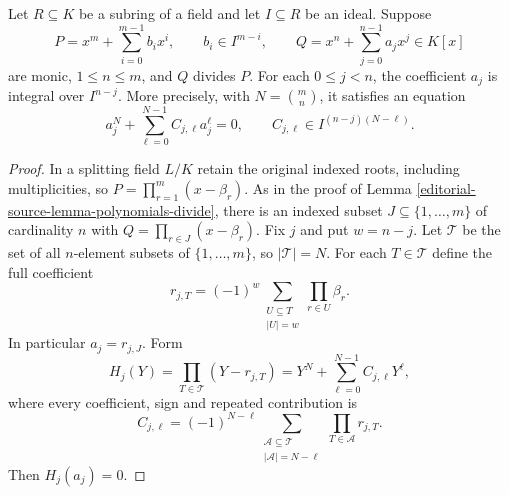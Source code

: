 \begin{lemma}
\label{editorial-source-lemma-weighted-monic-factor-coefficients}
Let $R\subseteq K$ be a subring of a field and let $I\subseteq R$
be an ideal. Suppose
$$
P=x^m+\sum_{i=0}^{m-1}b_ix^i,\qquad b_i\in I^{m-i},
\qquad Q=x^n+\sum_{j=0}^{n-1}a_jx^j\in K[x]
$$
are monic, $1\leq n\leq m$, and $Q$ divides $P$.
For each $0\leq j<n$, the coefficient $a_j$ is integral over
$I^{n-j}$. More precisely, with $N=\binom{m}{n}$, it satisfies
an equation
$$
a_j^N+\sum_{\ell=0}^{N-1}C_{j,\ell}a_j^\ell=0,
\qquad C_{j,\ell}\in I^{(n-j)(N-\ell)}.
$$
\end{lemma}

\begin{proof}
In a splitting field $L/K$ retain the original indexed roots,
including multiplicities, so
$P=\prod_{r=1}^m(x-\beta_r)$. As in the proof of
Lemma \ref{editorial-source-lemma-polynomials-divide}, there is an indexed subset
$J\subseteq\{1,\ldots,m\}$ of cardinality $n$ with
$Q=\prod_{r\in J}(x-\beta_r)$. Fix $j$ and put $w=n-j$.
Let $\mathcal T$ be the set of all $n$-element subsets of
$\{1,\ldots,m\}$, so $|\mathcal T|=N$. For each $T\in\mathcal T$
define the full coefficient
$$
r_{j,T}=(-1)^w
\sum_{\substack{U\subseteq T\\|U|=w}}\prod_{r\in U}\beta_r.
$$
In particular $a_j=r_{j,J}$. Form
$$
H_j(Y)=\prod_{T\in\mathcal T}(Y-r_{j,T})
=Y^N+\sum_{\ell=0}^{N-1}C_{j,\ell}Y^\ell,
$$
where every coefficient, sign and repeated contribution is
$$
C_{j,\ell}=(-1)^{N-\ell}
\sum_{\substack{\mathcal A\subseteq\mathcal T\\|\mathcal A|=N-\ell}}
\prod_{T\in\mathcal A}r_{j,T}.
$$
Then $H_j(a_j)=0$.


\end{proof}
